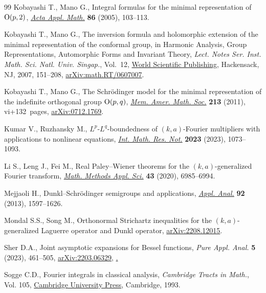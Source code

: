 \documentclass[10pt,a4paper]{amsart}
\numberwithin{equation}{section}
\begin{document}
\begin{thebibliography}{99}
Kobayashi T., Mano G., Integral formulas for the minimal representation of
 {${\rm O}(p,2)$}, \href{https://doi.org/10.1007/s10440-005-0464-2}{\textit{Acta Appl. Math.}} \textbf{86} (2005), 103--113.

Kobayashi T., Mano G., The inversion formula and holomorphic extension of the
 minimal representation of the conformal group, in Harmonic {A}nalysis,
 {G}roup {R}epresentations, {A}utomorphic {F}orms and {I}nvariant {T}heory,
 \textit{Lect. Notes Ser. Inst. Math. Sci. Natl. Univ. Singap.}, Vol.~12,
 \href{https://doi.org/10.1142/9789812770790_0006}{World Scientific Publishing}, Hackensack, NJ, 2007, 151--208,
 \href{https://arxiv.org/abs/math.RT/0607007}{arXiv:math.RT/0607007}.

Kobayashi T., Mano G., The {S}chr\"odinger model for the minimal representation
 of the indefinite orthogonal group {${\rm O}(p,q)$}, \href{https://doi.org/10.1090/S0065-9266-2011-00592-7}{\textit{Mem. Amer. Math.
 Soc.}} \textbf{213} (2011), vi+132~pages, \href{https://arxiv.org/abs/0712.1769}{arXiv:0712.1769}.

Kumar V., Ruzhansky M., {$L^p$}-{$L^q$}-boundedness of {$(k,a)$}-{F}ourier
 multipliers with applications to nonlinear equations, \href{https://doi.org/10.1093/imrn/rnab256}{\textit{Int. Math. Res.
 Not.}} \textbf{2023} (2023), 1073--1093.

Li S., Leng J., Fei M., Real {P}aley--{W}iener theorems for the
 {$(k,a)$}-generalized {F}ourier transform, \href{https://doi.org/10.1002/mma.6449}{\textit{Math. Methods Appl. Sci.}}
 \textbf{43} (2020), 6985--6994.

Mejjaoli H., Dunkl--{S}chr\"odinger semigroups and applications, \href{https://doi.org/10.1080/00036811.2012.692780}{\textit{Appl.
 Anal.}} \textbf{92} (2013), 1597--1626.

Mondal S.S., Song M., Orthonormal Strichartz inequalities for the
 {$(k,a)$}-generalized {L}aguerre operator and {D}unkl operator,
 \href{https://arxiv.org/abs/2208.12015}{arXiv:2208.12015}.

Sher D.A., Joint asymptotic expansions for {B}essel functions, \textit{Pure
 Appl. Anal.} \textbf{5} (2023), 461--505, \href{https://arxiv.org/abs/2203.06329}{arXiv:2203.06329},
 \href{https://doi.org/10.2140/paa.2023.5.461}.

Sogge C.D., Fourier integrals in classical analysis, \textit{Cambridge Tracts
 in Math.}, Vol. 105, \href{https://doi.org/10.1017/CBO9780511530029}{Cambridge University Press}, Cambridge, 1993.


\end{thebibliography}
\end{document}
